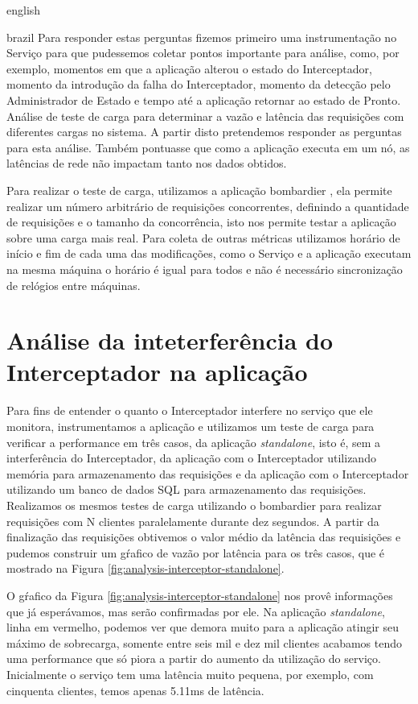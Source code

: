 \begin{otherlanguage*}{english}
\begin{otherlanguage*}{brazil}
Para responder estas perguntas fizemos primeiro uma instrumentação no Serviço para que
pudessemos coletar pontos importante para análise, como, por exemplo, momentos em que a
aplicação alterou o estado do Interceptador, momento da introdução da falha do Interceptador,
momento da detecção pelo Administrador de Estado e tempo até a aplicação retornar ao estado
de Pronto. Análise de teste de carga para determinar a vazão e latência das requisições com
diferentes cargas no sistema. A partir disto pretendemos responder as perguntas para esta
análise. Também pontuasse que como a aplicação executa em um nó, as latências de rede não
impactam tanto nos dados obtidos.

Para realizar o teste de carga, utilizamos a aplicação bombardier \cite{bombardier}, ela
permite realizar um número arbitrário de requisições concorrentes, definindo a quantidade
de requisições e o tamanho da concorrência, isto nos permite testar a aplicação sobre uma
carga mais real. Para coleta de outras métricas utilizamos horário de início e fim de cada
uma das modificações, como o Serviço e a aplicação executam na mesma máquina o horário é
igual para todos e não é necessário sincronização de relógios entre máquinas.

\section{Análise da inteterferência do Interceptador na aplicação}

Para fins de entender o quanto o Interceptador interfere no serviço que ele monitora,
instrumentamos a aplicação e utilizamos um teste de carga para verificar a performance
em três casos, da aplicação \textit{standalone}, isto é, sem a interferência do Interceptador,
da aplicação com o Interceptador utilizando memória para armazenamento das requisições e 
da aplicação com o Interceptador utilizando um banco de dados SQL para armazenamento das
requisições. Realizamos os mesmos testes de carga utilizando o bombardier para realizar
requisições com N clientes paralelamente durante dez segundos. A partir da finalização
das requisições obtivemos o valor médio da latência das requisições e pudemos construir 
um gŕafico de vazão por latência para os três casos, que é mostrado na Figura
\ref{fig:analysis-interceptor-standalone}.

O gŕafico da Figura \ref{fig:analysis-interceptor-standalone} nos provê informações que já
esperávamos, mas serão confirmadas por ele. Na aplicação \textit{standalone}, linha em vermelho,
podemos ver que demora muito para a aplicação atingir seu máximo de sobrecarga, somente entre
seis mil e dez mil clientes acabamos tendo uma performance que só piora a partir do aumento
da utilização do serviço. Inicialmente o serviço tem uma latência muito pequena, por exemplo,
com cinquenta clientes, temos apenas 5.11ms de latência.


\end{otherlanguage*}
\end{otherlanguage*}
